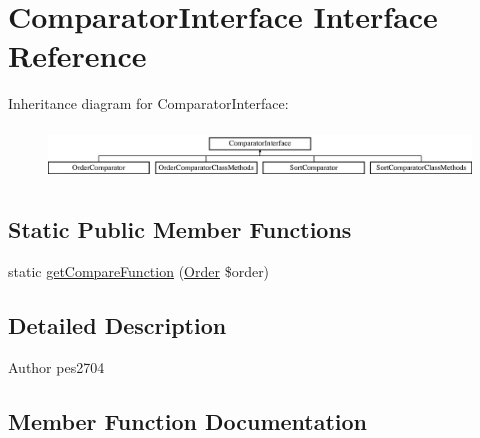 \hypertarget{interface_pes_1_1_comparator_1_1_comparator_interface}{}\section{Comparator\+Interface Interface Reference}
\label{interface_pes_1_1_comparator_1_1_comparator_interface}
Inheritance diagram for Comparator\+Interface\+:\begin{figure}[H]
\begin{center}
\leavevmode
\includegraphics[height=1.407035cm]{interface_pes_1_1_comparator_1_1_comparator_interface}
\end{center}
\end{figure}
\subsection*{Static Public Member Functions}
\begin{DoxyCompactItemize}
\item 
static \mbox{\hyperlink{interface_pes_1_1_comparator_1_1_comparator_interface_a21aeb75d37fce6724b5a60f836dfc85c}{get\+Compare\+Function}} (\mbox{\hyperlink{class_pes_1_1_query_1_1_order}{Order}} \$order)
\end{DoxyCompactItemize}


\subsection{Detailed Description}
\begin{DoxyAuthor}{Author}
pes2704 
\end{DoxyAuthor}


\subsection{Member Function Documentation}
\mbox{\label{interface_pes_1_1_comparator_1_1_comparator_interface_a21aeb75d37fce6724b5a60f836dfc85c}} 
